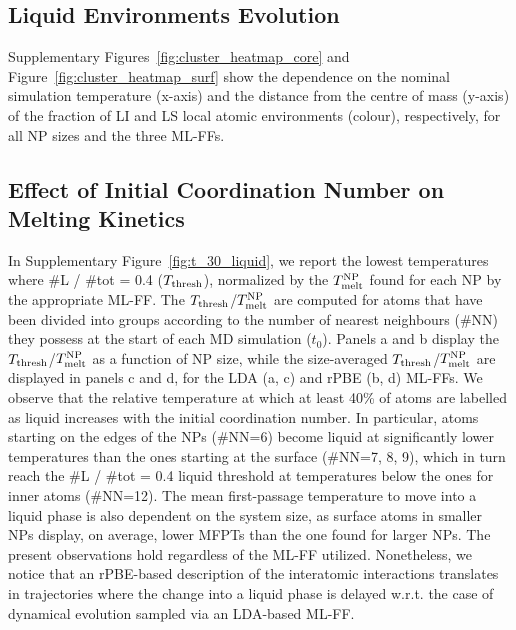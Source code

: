 \documentclass[%
aip,
 amsmath,amssymb,
 reprint,
]{revtex4-1}
\newcommand*\subt[1]{_{\textnormal{#1}}}
\newcommand*\supt[1]{^{\textnormal{#1}}}
\begin{document}
\subsection*{Liquid Environments Evolution}
%
Supplementary Figures~\ref{fig:cluster_heatmap_core} and Figure~\ref{fig:cluster_heatmap_surf} show the dependence on the nominal simulation temperature (x-axis) and the distance from the centre of mass (y-axis) of the fraction of LI and LS local atomic environments (colour), respectively,  for all NP sizes and the three ML-FFs.
%

\subsection*{Effect of Initial Coordination Number on Melting Kinetics}
%
In Supplementary Figure~\ref{fig:t_30_liquid}, we report the lowest temperatures where \#L / \#tot = 0.4 ($T\subt{thresh}$), normalized by the $T\subt{melt}\supt{NP}$ found for each NP by the appropriate ML-FF.
%
The $T\subt{thresh}$/$T\subt{melt}\supt{NP}$ are computed for atoms that have been divided into groups according to the number of nearest neighbours (\#NN) they possess at the start of each MD simulation ($t_0$).
%
Panels a and b display the $T\subt{thresh}$/$T\subt{melt}\supt{NP}$ as a function of NP size, while the size-averaged $T\subt{thresh}$/$T\subt{melt}\supt{NP}$ are displayed in panels c and d, for the LDA (a, c) and rPBE (b, d) ML-FFs.
%
We observe that the relative temperature at which at least 40\% of atoms are labelled as liquid increases with the initial coordination number.
%
In particular, atoms starting on the edges of the NPs (\#NN=6) become liquid at significantly lower temperatures than the ones starting at the surface (\#NN=7, 8, 9), which in turn reach the \#L / \#tot = 0.4 liquid threshold at temperatures below the ones for inner atoms (\#NN=12).
%
The mean first-passage temperature to move into a liquid phase is also dependent on the system size, as surface atoms in smaller NPs display, on average, lower MFPTs than the one found for larger NPs.
%
The present observations hold regardless of the ML-FF utilized. Nonetheless, we notice that an rPBE-based description of the interatomic interactions translates in trajectories where the change into a liquid phase is delayed w.r.t. the case of dynamical evolution sampled via an LDA-based ML-FF.
%
\end{document}
